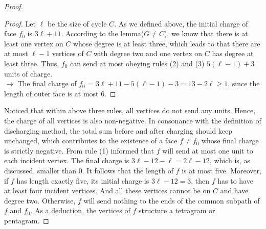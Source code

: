 \begin{proof}
\begin{proof}
Let $\ell$ be the size of cycle $C$. As we defined above, the initial charge of face $f_0$ is $3 \ell + 11$. According to the lemma($G \ne C$), we know that there is at least one vertex on $C$ whose degree is at least three, which leads to that there are at most $\ell - 1$ vertices of $C$ with degree two and one vertex on $C$ has degree at least three. Thus, $f_0$ can send at most obeying rules (2) and (3) $5(\ell - 1) + 3$ units of charge.\\
$\longrightarrow$ The final charge of $f_0$ = $3\ell + 11 - 5(\ell - 1) - 3 = 13 - 2\ell \geq 1$, since the length of outer face is at most 6.
\end{proof}
Noticed that within above three rules, all vertices do not send any units. Hence, the charge of all vertices is also non-negative. In consonance with the definition of discharging method, the total sum before and after charging should keep unchanged, which contributes to the existence of a face $f \ne f_0$ whose final charge is strictly negative. From rule (1) informed that $f$ will send at most one unit to each incident vertex. The final charge is $3\ell - 12 - \ell = 2\ell - 12$, which is, as discussed, smaller than 0. It follows that the length of $f$ is at most five. Moreover, if $f$ has length exactly five, its initial charge is $3\ell - 12 = 3$, then $f$ has to have at least four incident vertices. And all these vertices cannot be on $C$ and have degree two. Otherwise, $f$ will send nothing to the ends of the common subpath of $f$ and $f_0$. As a deduction, the vertices of $f$ structure a tetragram or pentagram.
\end{proof}

